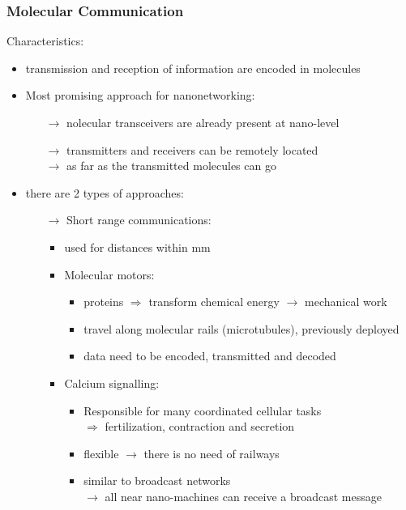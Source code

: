 \subsubsection{Molecular Communication}
Characteristics:
\begin{itemize}
    \item transmission and reception
    of information are encoded in molecules
    \item Most promising approach for nanonetworking:
    \begin{itemize}
        \item[$\rightarrow$] nolecular transceivers are already present at nano-level
        \item[$\rightarrow$] transmitters and receivers can be remotely located\\
        $\rightarrow$ as far as the transmitted molecules can go
    \end{itemize}
    \item there are 2 types of approaches:
    \begin{itemize}
        \item[$\rightarrow$] Short range communications:
        \begin{itemize}
            \item used for distances within mm
            \item Molecular motors:
            \begin{itemize}
                \item proteins $\Rightarrow$ transform
                chemical energy $\rightarrow$ mechanical work
                \item travel along molecular rails (microtubules), previously deployed
                \item data need to be encoded, transmitted and decoded
            \end{itemize}
            \item Calcium signalling:
            \begin{itemize}
                \item Responsible for many coordinated cellular tasks\\
                $\Rightarrow$ fertilization, contraction and secretion
                \item flexible $\rightarrow$ there is no need of railways
                \item similar to broadcast networks\\
                $\rightarrow$ all near nano-machines can receive a broadcast message

\end{itemize}
\end{itemize}
\end{itemize}
\end{itemize}
